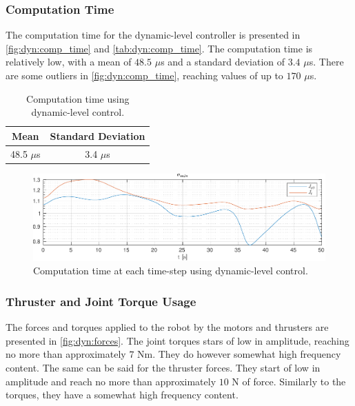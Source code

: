 \subsubsection{Computation Time}

The computation time for the dynamic-level controller is presented in \autoref{fig:dyn:comp_time}
and \autoref{tab:dyn:comp_time}. The computation time is relatively low, with a mean of $48.5$ $\mu$s
and a standard deviation of $3.4$ $\mu$s. There are some outliers in \autoref{fig:dyn:comp_time},
reaching values of up to $170$ $\mu$s.

\begin{table}[h!]
    \centering
    \begin{tabular}{|c|c|}
        \hline
        Mean & Standard Deviation \\ \hline
        48.5 $\mu$s & 3.4 $\mu$s \\ \hline
    \end{tabular}
    \caption{Computation time using dynamic-level control.}
    \label{tab:dyn:comp_time}
\end{table}

\begin{figure}[h!]
    \centering
    \includegraphics[page=3,width=\linewidth]{assets/results/dynamic/h5data.pdf}
    \caption{Computation time at each time-step using dynamic-level control.}
    \label{fig:dyn:comp_time}
\end{figure}

\subsubsection{Thruster and Joint Torque Usage}

The forces and torques applied to the robot by the motors and thrusters are presented
in \autoref{fig:dyn:forces}. The joint torques stars of low in amplitude, reaching no more than
approximately $7$ Nm. They do however somewhat high frequency content. The same can be said
for the thruster forces. They start of low in amplitude and reach no more than approximately
$10$ N of force. Similarly to the torques, they have a somewhat high frequency content.

